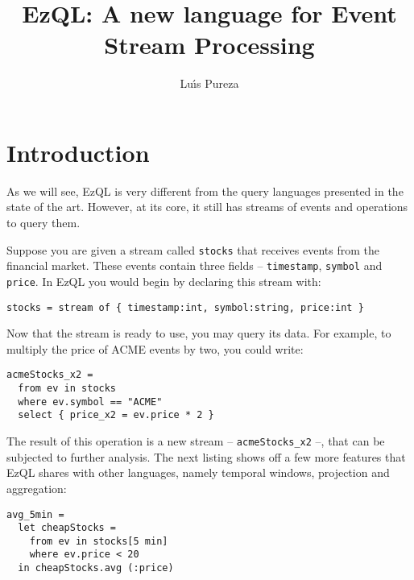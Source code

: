 \documentclass[a4,11pt]{report}
\begin{document}
\title{EzQL: A new language for Event Stream Processing}
\author{Lu\'{\i}s Pureza}

\maketitle

\tableofcontents

\addtolength{\parskip}{\baselineskip}
\chapter{Introduction}
\label{chap:introduction}

\lstset{
  language=EzQL,
  columns=fullflexible,
  basicstyle=\tt,
  keywordstyle=[1]\bf,
  keywordstyle=[2]\it,
}


As we will see, EzQL is very different from the query languages
presented in the state of the art. However, at its core, it still has
streams of events and operations to query them.

Suppose you are given a stream called \verb=stocks= that receives
events from the financial market. These events contain three fields --
\verb=timestamp=, \verb=symbol= and \verb=price=. In EzQL you would
begin by declaring this stream with:

\begin{lstlisting}
stocks = stream of { timestamp:int, symbol:string, price:int }
\end{lstlisting}

Now that the stream is ready to use, you may query its data. For
example, to multiply the price of ACME events by two, you could write:

\begin{lstlisting}
acmeStocks_x2 =
  from ev in stocks
  where ev.symbol == "ACME"
  select { price_x2 = ev.price * 2 }
\end{lstlisting}

The result of this operation is a new stream -- \verb=acmeStocks_x2=
--, that can be subjected to further analysis. The next listing shows
off a few more features that EzQL shares with other languages, namely
temporal windows, projection and aggregation:

\begin{lstlisting}
avg_5min =
  let cheapStocks =
    from ev in stocks[5 min]
    where ev.price < 20
  in cheapStocks.avg (:price)
\end{lstlisting}
\end{document}
